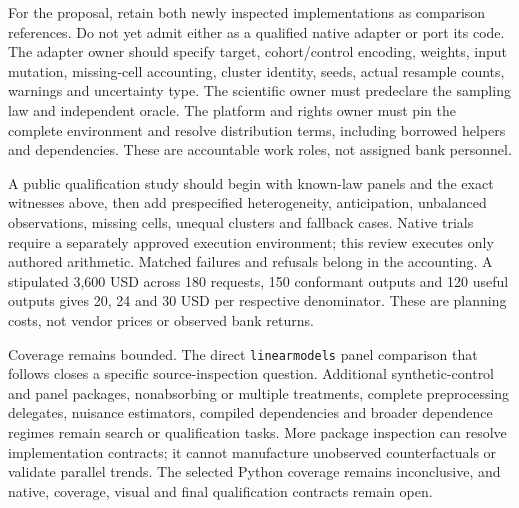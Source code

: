 For the proposal, retain both newly inspected implementations as comparison
references. Do not yet admit either as a qualified native adapter or port its
code. The adapter owner should specify target, cohort/control encoding,
weights, input mutation, missing-cell accounting, cluster identity, seeds,
actual resample counts, warnings and uncertainty type. The scientific owner
must predeclare the sampling law and independent oracle. The platform and
rights owner must pin the complete environment and resolve distribution
terms, including borrowed helpers and dependencies. These are accountable
work roles, not assigned bank personnel.
\citep{exec24_panelpy_contract,exec24_panelpy_differences,exec24_panelpy_csdid}

A public qualification study should begin with known-law panels and the
exact witnesses above, then add prespecified heterogeneity, anticipation,
unbalanced observations, missing cells, unequal clusters and fallback cases.
Native trials require a separately approved execution environment; this
review executes only authored arithmetic. Matched failures and refusals
belong in the accounting. A stipulated 3,600 USD across 180 requests,
150 conformant outputs and 120 useful outputs gives 20, 24 and 30 USD
per respective denominator. These are planning costs, not vendor prices
or observed bank returns.
\citep{exec24_panelpy_contract}

Coverage remains bounded. The direct \texttt{linearmodels} panel comparison
that follows closes a specific source-inspection question. Additional
synthetic-control and panel packages, nonabsorbing or multiple treatments,
complete preprocessing delegates, nuisance estimators, compiled dependencies
and broader dependence regimes remain search or qualification tasks. More package inspection can resolve implementation
contracts; it cannot manufacture unobserved counterfactuals or validate
parallel trends. The selected Python coverage remains inconclusive, and
native, coverage, visual and final qualification contracts remain open.
\citep{exec24_panelpy_contract}
